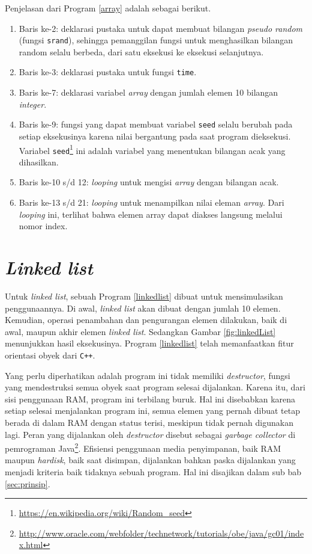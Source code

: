 Penjelasan dari Program \ref{array} adalah sebagai berikut.
\begin{enumerate}
\item Baris ke-2: deklarasi pustaka untuk dapat membuat bilangan \textit{pseudo random} (fungsi \texttt{srand}), sehingga pemanggilan fungsi untuk menghasilkan bilangan random selalu berbeda, dari satu eksekusi ke eksekusi selanjutnya.
\item Baris ke-3: deklarasi pustaka untuk fungsi \texttt{time}.
\item Baris ke-7: deklarasi variabel \textit{array} dengan jumlah elemen 10 bilangan \textit{integer}.
\item Baris ke-9: fungsi yang dapat membuat variabel \texttt{seed} selalu berubah pada setiap eksekusinya karena nilai bergantung pada saat program dieksekusi. Variabel \texttt{seed}\footnote{\url{https://en.wikipedia.org/wiki/Random_seed}} ini adalah variabel yang menentukan bilangan acak yang dihasilkan.
\item Baris ke-10 s/d 12: \textit{looping} untuk mengisi \textit{array} dengan bilangan acak.
\item Baris ke-13 s/d 21: \textit{looping} untuk menampilkan nilai eleman \textit{array}. Dari \textit{looping} ini, terlihat bahwa elemen array dapat diakses langsung melalui nomor index.
\end{enumerate}

\section{\textit{Linked list}}
Untuk \textit{linked list}, sebuah Program \ref{linkedlist} dibuat untuk mensimulasikan penggunaannya. Di awal, \textit{linked list} akan dibuat dengan jumlah 10 elemen. Kemudian, operasi penambahan dan pengurangan elemen dilakukan, baik di awal, maupun akhir elemen \textit{linked list}. Sedangkan Gambar \ref{fig:linkedList} menunjukkan hasil eksekusinya. Program \ref{linkedlist} telah memanfaatkan fitur orientasi obyek dari \texttt{C++}. 

Yang perlu diperhatikan adalah program ini tidak memiliki \textit{destructor}, fungsi yang mendestruksi semua obyek saat program selesai dijalankan. Karena itu, dari sisi penggunaan RAM, program ini terbilang buruk. Hal ini disebabkan karena setiap selesai menjalankan program ini, semua elemen yang pernah dibuat tetap berada di dalam RAM dengan status terisi, meskipun tidak pernah digunakan lagi. Peran yang dijalankan oleh \textit{destructor} disebut sebagai \textit{garbage collector} di pemrograman Java\footnote{\url{http://www.oracle.com/webfolder/technetwork/tutorials/obe/java/gc01/index.html}}. Efisiensi penggunaan media penyimpanan, baik RAM maupun \textit{hardisk}, baik saat disimpan, dijalankan bahkan paska dijalankan yang menjadi kriteria baik tidaknya sebuah program. Hal ini disajikan dalam sub bab \ref{sec:prinsip}.

